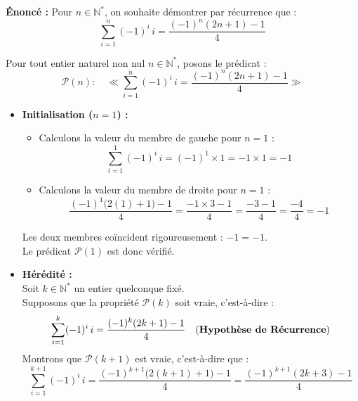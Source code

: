 \documentclass[11pt,a4paper]{article}
\newcommand{\bareme}[1]{\hfill\textbf{\textcolor{secondary}{\sffamily[#1]}}}
\newcommand{\N}{\mathbb{N}}
\begin{document}
\begin{correctionbox}[Corrigé de l'Exercice 4 \bareme{Total : 4 points}]
\textbf{Énoncé :} Pour $n \in \N^*$, on souhaite démontrer par récurrence que :
\[
\sum_{i=1}^n (-1)^i \, i = \frac{(-1)^n (2n+1) - 1}{4}
\]

Pour tout entier naturel non nul $n \in \N^*$, posons le prédicat :
\[
\mathcal{P}(n) : \quad \ll \sum_{i=1}^n (-1)^i \, i = \frac{(-1)^n (2n+1) - 1}{4} \gg
\]

\begin{itemize}[leftmargin=*, label=$\bullet$]
    \item \textbf{Initialisation ($n = 1$) :} \bareme{1,0 pt}
    \begin{itemize}[leftmargin=*, label=$-$]
        \item Calculons la valeur du membre de gauche pour $n = 1$ :
        \[
        \sum_{i=1}^1 (-1)^i \, i = (-1)^1 \times 1 = -1 \times 1 = -1
        \]
        \item Calculons la valeur du membre de droite pour $n = 1$ :
        \[
        \frac{(-1)^1 \big(2(1) + 1\big) - 1}{4} = \frac{-1 \times 3 - 1}{4} = \frac{-3 - 1}{4} = \frac{-4}{4} = -1
        \]
    \end{itemize}
    Les deux membres coïncident rigoureusement : $-1 = -1$.\\
    Le prédicat $\mathcal{P}(1)$ est donc vérifié.

    \item \textbf{Hérédité :} \bareme{2,5 pts}\\
    Soit $k \in \N^*$ un entier quelconque fixé.\\
    Supposons que la propriété $\mathcal{P}(k)$ soit vraie, c'est-à-dire :
    \[
    \sum_{i=1}^k (-1)^i \, i = \frac{(-1)^k (2k+1) - 1}{4} \quad \text{(\textbf{Hypothèse de Récurrence})}
    \]
    Montrons que $\mathcal{P}(k+1)$ est vraie, c'est-à-dire que :
    \[
    \sum_{i=1}^{k+1} (-1)^i \, i = \frac{(-1)^{k+1} \big(2(k+1)+1\big) - 1}{4} = \frac{(-1)^{k+1} (2k+3) - 1}{4}
    \]
    

\end{itemize}
\end{correctionbox}
\end{document}
